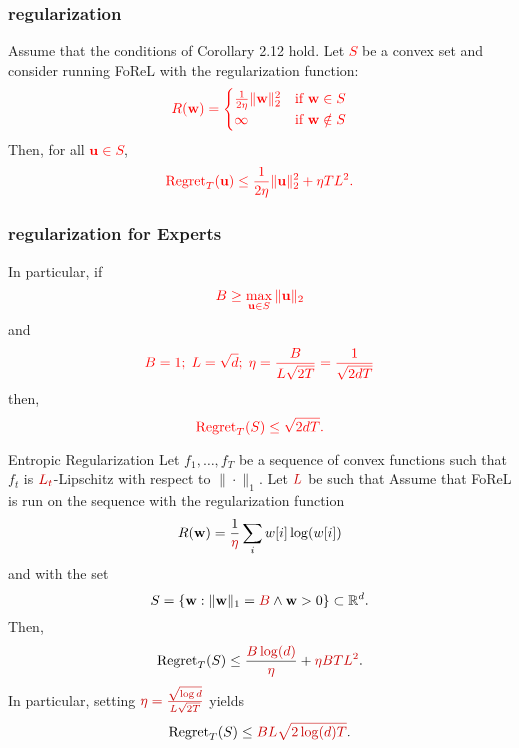 \documentclass[handout]{beamer}
\newcommand{\redmath}[1]{\textcolor{mathred}{#1}}
\begin{document}
\begin{frame}
    \frametitle{ regularization}
    Assume that the conditions of Corollary 2.12 hold. Let 
    \textcolor{red}{$S$} 
    be a convex set and consider running FoReL with the regularization function:
    \[
    \textcolor{red}{R(\mathbf{w}) = 
    \begin{cases} 
    \frac{1}{2\eta} \|\mathbf{w}\|_2^2 & \text{if } \mathbf{w} \in S \\ 
    \infty & \text{if } \mathbf{w} \notin S 
    \end{cases}}
    \]
    Then, for all 
    \textcolor{red}{$\mathbf{u} \in S$},
    \[
    \textcolor{red}{\operatorname{Regret}_T(\mathbf{u}) \leq \frac{1}{2\eta} \|\mathbf{u}\|_2^2 + \eta T L^2.}
    \]
\end{frame}

\begin{frame}
    \frametitle{ regularization for Experts}
    In particular, if 
    \[
    \textcolor{red}{B \geq \max_{\mathbf{u} \in S} \|\mathbf{u}\|_2}
    \]
    and 
    \[
    \textcolor{red}{B=1;\; L=\sqrt{d};\;\eta = \frac{B}{L \sqrt{2T}}=\frac{1}{\sqrt{2dT}}}
    \]
    then,
    \[
    \textcolor{red}{\operatorname{Regret}_T(S) \leq \sqrt{2dT}.}
    \]
\end{frame}


\begin{frame}{Entropic Regularization}
    Let \( f_1, \dots, f_T \) be a sequence of convex functions such that 
    \( f_t \) is \( \redmath{L_t} \)-Lipschitz with respect to \( \|\cdot\|_1 \). 
    Let \( \redmath{L} \) be such that 
    \R{$
    \frac{1}{T} \sum_{t=1}^{T} \redmath{L_t^2} \leq \redmath{L^2}.
    $}
    Assume that FoReL is run on the sequence with the regularization function 
    \[
    R(\mathbf{w}) = \frac{1}{\redmath{\eta}} \sum_{i} w[i] \log(w[i])
    \]
    and with the set 
    \[
    S = \{\mathbf{w} : \|\mathbf{w}\|_1 = \redmath{B} \wedge \mathbf{w} > 0 \} \subset \mathbb{R}^d.
    \]
    Then, 
    \[
    \text{Regret}_T(S) \leq \frac{\redmath{B \log(d)}}{\redmath{\eta}} + \redmath{\eta BTL^2}.
    \]
    In particular, setting \( \redmath{\eta = \frac{\sqrt{\log d}}{L\sqrt{2T}}} \) yields
    \[
    \text{Regret}_T(S) \leq \redmath{BL\sqrt{2\log(d)T}}.
    \]
  \end{frame}
\end{document}
